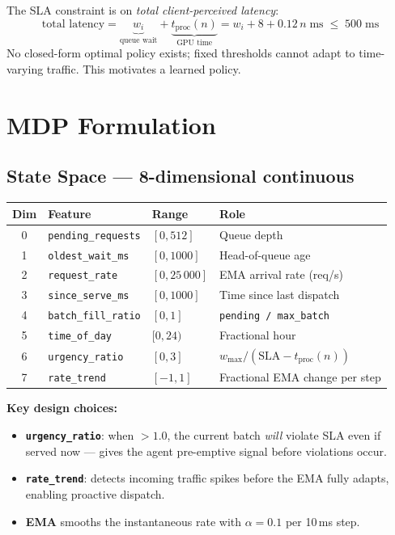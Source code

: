\documentclass[11pt,a4paper]{article}
\begin{document}
\medskip
The SLA constraint is on \emph{total client-perceived latency}:
\begin{equation}
  \text{total latency} = \underbrace{w_i}_{\text{queue wait}} +
  \underbrace{t_\text{proc}(n)}_{\text{GPU time}}
  = w_i + 8 + 0.12\,n \;\text{ms}
  \;\leq\; 500\;\text{ms}
  \label{eq:sla}
\end{equation}
No closed-form optimal policy exists; fixed thresholds cannot adapt to
time-varying traffic. This motivates a learned policy.

\section{MDP Formulation}

\subsection{State Space — 8-dimensional continuous}

\begin{tabular}{@{}clll@{}}
\toprule
\textbf{Dim} & \textbf{Feature} & \textbf{Range} & \textbf{Role} \\
\midrule
0 & \texttt{pending\_requests} & $[0, 512]$      & Queue depth \\
1 & \texttt{oldest\_wait\_ms}  & $[0, 1000]$     & Head-of-queue age \\
2 & \texttt{request\_rate}     & $[0, 25\,000]$  & EMA arrival rate (req/s) \\
3 & \texttt{since\_serve\_ms}  & $[0, 1000]$     & Time since last dispatch \\
4 & \texttt{batch\_fill\_ratio}& $[0, 1]$        & \texttt{pending / max\_batch} \\
5 & \texttt{time\_of\_day}     & $[0, 24)$       & Fractional hour \\
6 & \texttt{urgency\_ratio}    & $[0, 3]$        & $w_\max / (\text{SLA} - t_\text{proc}(n))$ \\
7 & \texttt{rate\_trend}       & $[-1, 1]$       & Fractional EMA change per step \\
\bottomrule
\end{tabular}

\medskip
\noindent\textbf{Key design choices:}
\begin{itemize}[noitemsep]
  \item \textbf{\texttt{urgency\_ratio}}: when $>1.0$, the current batch
        \emph{will} violate SLA even if served now — gives the agent pre-emptive
        signal before violations occur.
  \item \textbf{\texttt{rate\_trend}}: detects incoming traffic spikes before
        the EMA fully adapts, enabling proactive dispatch.
  \item \textbf{EMA} smooths the instantaneous rate with $\alpha=0.1$ per 10\,ms step.
\end{itemize}
\end{document}
